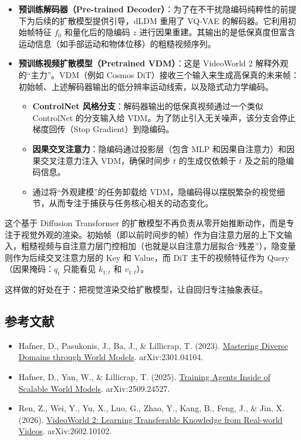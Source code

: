 \begin{itemize}
\tightlist
\item
  \textbf{预训练解码器（Pre-trained Decoder）}：为了在不干扰隐编码纯粹性的前提下为后续的扩散模型提供引导，dLDM 重用了 VQ-VAE 的解码器。它利用初始帧特征 \(f_0\) 和量化后的隐编码 \(z\) 进行因果重建。其输出的是低保真度但富含运动信息（如手部运动和物体位移）的粗糙视频序列。
\item
  \textbf{预训练视频扩散模型（Pretrained VDM）}：这是 VideoWorld 2 解释外观的``主力''。VDM（例如 Cosmos DiT）接收三个输入来生成高保真的未来帧：初始帧、上述解码器输出的低分辨率运动线索，以及隐式动力学编码。

  \begin{itemize}
  \tightlist
  \item
    \textbf{ControlNet 风格分支}：解码器输出的低保真视频通过一个类似 ControlNet 的分支输入给 VDM。为了防止引入无关噪声，该分支会停止梯度回传（Stop Gradient）到隐编码。
  \item
    \textbf{因果交叉注意力}：隐编码通过投影层（包含 MLP 和因果自注意力）和因果交叉注意力注入 VDM，确保时间步 \(t\) 的生成仅依赖于 \(t\) 及之前的隐编码信息。
  \item
    通过将``外观建模''的任务卸载给 VDM，隐编码得以摆脱繁杂的视觉细节，从而专注于捕获与任务核心相关的动态变化。
  \end{itemize}
\end{itemize}

这个基于 Diffusion Transformer 的扩散模型不再负责从零开始推断动作，而是专注于视觉外观的渲染。初始帧（即以前时间步的帧）作为自注意力层的上下文输入，粗糙视频与自注意力层门控相加（也就是以自注意力层拟合``残差''），隐变量则作为后续交叉注意力层的 Key 和 Value，而 DiT 主干的视频特征作为 Query（因果掩码：\(q_t\) 只能看见 \(k_{1:t}\) 和 \(v_{1:t}\)）。

这样做的好处在于：把视觉渲染交给扩散模型，让自回归专注抽象表征。

\hypertarget{ux53c2ux8003ux6587ux732e-188}{%
\subsection{参考文献}\label{ux53c2ux8003ux6587ux732e-188}}

\begin{itemize}
\tightlist
\item
  Hafner, D., Pasukonis, J., Ba, J., \& Lillicrap, T. (2023). \href{https://arxiv.org/abs/2301.04104}{Mastering Diverse Domains through World Models}. arXiv:2301.04104.
\item
  Hafner, D., Yan, W., \& Lillicrap, T. (2025). \href{https://arxiv.org/abs/2509.24527}{Training Agents Inside of Scalable World Models}. arXiv:2509.24527.
\item
  Ren, Z., Wei, Y., Yu, X., Luo, G., Zhao, Y., Kang, B., Feng, J., \& Jin, X. (2026). \href{https://arxiv.org/abs/2602.10102}{VideoWorld 2: Learning Transferable Knowledge from Real-world Videos}. arXiv:2602.10102.
\end{itemize}

